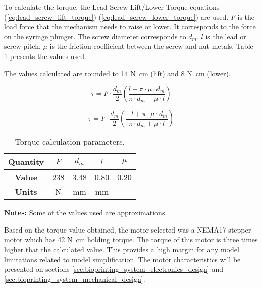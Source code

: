 To calculate the torque, the Lead Screw Lift/Lower Torque equations (\ref{eq:lead_screw_lift_torque}) (\ref{eq:lead_screw_lower_torque}) are used. $F$ is the load force that the mechanism needs to raise or lower. It corresponds to the force on the syringe plunger. The screw diameter corresponds to $d_m$. $l$ is the lead or screw pitch. $\mu$ is the friction coefficient between the screw and nut metals. Table \ref{tab:torque_calculation_dimensions} presents the values used.

The values calculated are rounded to 14 \si{\newton\centi\meter} (lift) and 8 \si{\newton\centi\meter} (lower).

\begin{equation}
    \label{eq:lead_screw_lift_torque}
    \tau = F \cdot \frac{d_m}{2} \left(\frac{l + \pi \cdot \mu \cdot d_m}{\pi \cdot d_m - \mu \cdot l}\right)  
\end{equation}

\begin{equation}
    \label{eq:lead_screw_lower_torque}
    \tau = F \cdot \frac{d_m}{2} \left(\frac{-l + \pi \cdot \mu \cdot d_m}{\pi \cdot d_m + \mu \cdot l}\right)  
\end{equation}

\begin{table}[htbp]
    \caption{Torque calculation parameters.}
    \centering
    \begin{threeparttable}
        \begin{tabular}{c|c|c|c|c}
        \toprule
             \textbf{Quantity} & $F$ & $d_m$ & $l$ & $\mu$ \\
        \midrule
             \textbf{Value} & 238 & 3.48 & 0.80 & 0.20 \\
        \midrule
             \textbf{Units} & \si{\newton} & \si{\milli\meter} & \si{\milli\meter} & - \\
        \bottomrule
        \end{tabular}
        \begin{tablenotes}
            \small
            \item \textbf{Notes:} Some of the values used are approximations.
        \end{tablenotes}
    \end{threeparttable}
    \label{tab:torque_calculation_dimensions}
\end{table}

Based on the torque value obtained, the motor selected was a NEMA17 stepper motor which has 42 \si{\newton\centi\meter} holding torque. The torque of this motor is three times higher that the calculated value. This provides a high margin for any model limitations related to model simplification. The motor characteristics will be presented on sections \ref{sec:bioprinting_system_electronics_design} and \ref{sec:bioprinting_system_mechanical_design}.

